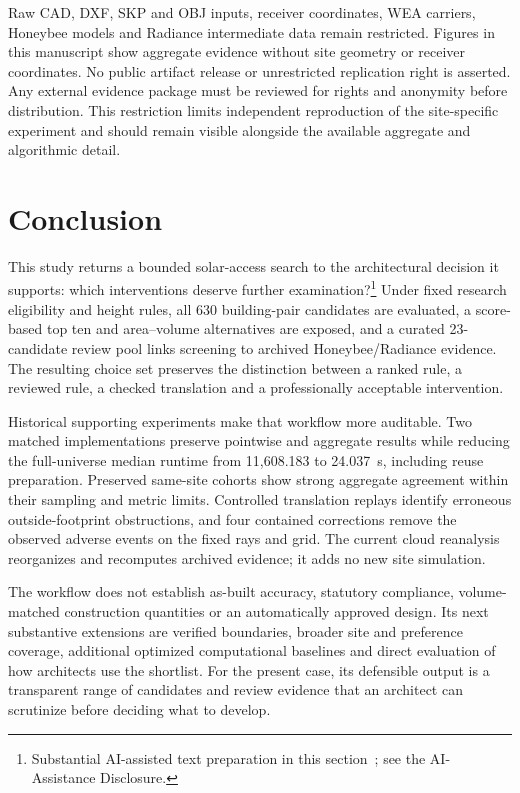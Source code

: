 \documentclass{llncs}
\newcommand{\aidraft}{\footnote{Substantial AI-assisted text preparation in this section~\cite{openai2026}; see the AI-Assistance Disclosure.}}
\begin{document}
Raw CAD, DXF, SKP and OBJ inputs, receiver coordinates, WEA carriers, Honeybee models and Radiance intermediate data remain restricted. Figures in this manuscript show aggregate evidence without site geometry or receiver coordinates. No public artifact release or unrestricted replication right is asserted. Any external evidence package must be reviewed for rights and anonymity before distribution. This restriction limits independent reproduction of the site-specific experiment and should remain visible alongside the available aggregate and algorithmic detail.

\section{Conclusion}
This study returns a bounded solar-access search to the architectural decision it supports: which interventions deserve further examination?\aidraft{} Under fixed research eligibility and height rules, all 630 building-pair candidates are evaluated, a score-based top ten and area--volume alternatives are exposed, and a curated 23-candidate review pool links screening to archived Honeybee/Radiance evidence. The resulting choice set preserves the distinction between a ranked rule, a reviewed rule, a checked translation and a professionally acceptable intervention.

Historical supporting experiments make that workflow more auditable. Two matched implementations preserve pointwise and aggregate results while reducing the full-universe median runtime from 11,608.183 to 24.037~s, including reuse preparation. Preserved same-site cohorts show strong aggregate agreement within their sampling and metric limits. Controlled translation replays identify erroneous outside-footprint obstructions, and four contained corrections remove the observed adverse events on the fixed rays and grid. The current cloud reanalysis reorganizes and recomputes archived evidence; it adds no new site simulation.

The workflow does not establish as-built accuracy, statutory compliance, volume-matched construction quantities or an automatically approved design. Its next substantive extensions are verified boundaries, broader site and preference coverage, additional optimized computational baselines and direct evaluation of how architects use the shortlist. For the present case, its defensible output is a transparent range of candidates and review evidence that an architect can scrutinize before deciding what to develop.
\end{document}

